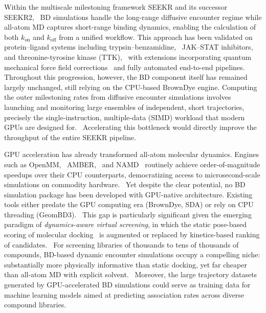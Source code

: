 \documentclass[journal=jctcce,manuscript=article,layout=twocolumn]{achemso}
\newcommand{\kon}{k_{\mathrm{on}}}
\newcommand{\koff}{k_{\mathrm{off}}}
\begin{document}
Within the multiscale milestoning framework SEEKR and its successor SEEKR2,~\cite{Votapka2017SEEKR,Votapka2022SEEKR2} BD simulations handle the long-range diffusive encounter regime while all-atom MD captures short-range binding dynamics, enabling the calculation of both $\kon$ and $\koff$ from a unified workflow. This approach has been validated on protein--ligand systems including trypsin--benzamidine,~\cite{Votapka2017SEEKR} JAK--STAT inhibitors,~\cite{Ojha2023JAKSTAT} and threonine-tyrosine kinase (TTK),~\cite{Votapka2024TTK} with extensions incorporating quantum mechanical force field corrections~\cite{Ojha2023QMrebind} and fully automated end-to-end pipelines.~\cite{Ojha2025seekrflow} Throughout this progression, however, the BD component itself has remained largely unchanged, still relying on the CPU-based BrownDye engine. Computing the outer milestoning rates from diffusive encounter simulations involves launching and monitoring large ensembles of independent, short trajectories, precisely the single-instruction, multiple-data (SIMD) workload that modern GPUs are designed for.~\cite{Ojha2024perspective} Accelerating this bottleneck would directly improve the throughput of the entire SEEKR pipeline.

GPU acceleration has already transformed all-atom molecular dynamics. Engines such as
OpenMM,~\cite{Eastman2017OpenMM} AMBER,~\cite{SalomonFerrer2013AMBER} and
NAMD~\cite{Phillips2020NAMD} routinely achieve order-of-magnitude speedups over their
CPU counterparts, democratizing access to microsecond-scale simulations on commodity
hardware.~\cite{Stone2010GPU} Yet despite the clear potential, no BD simulation package
has been developed with GPU-native architecture. Existing tools either predate the GPU
computing era (BrownDye, SDA) or rely on CPU threading
(GeomBD3).~\cite{Cholko2022GeomBD3} This gap is particularly significant given the
emerging paradigm of \textit{dynamics-aware virtual screening}, in which the static
pose-based scoring of molecular docking~\cite{Sledz2018,Huang2010docking} is augmented
or replaced by kinetics-based ranking of
candidates.~\cite{Ganesan2017,Ojha2023JAKSTAT} For screening libraries of thousands to
tens of thousands of compounds, BD-based dynamic encounter simulations occupy a
compelling niche: substantially more physically informative than static docking, yet
far cheaper than all-atom MD with explicit solvent.~\cite{Huber2019review,Ojha2024perspective} Moreover, the large trajectory datasets generated by GPU-accelerated BD simulations could serve as training data for machine learning models aimed at predicting association rates across diverse compound libraries.
\end{document}
